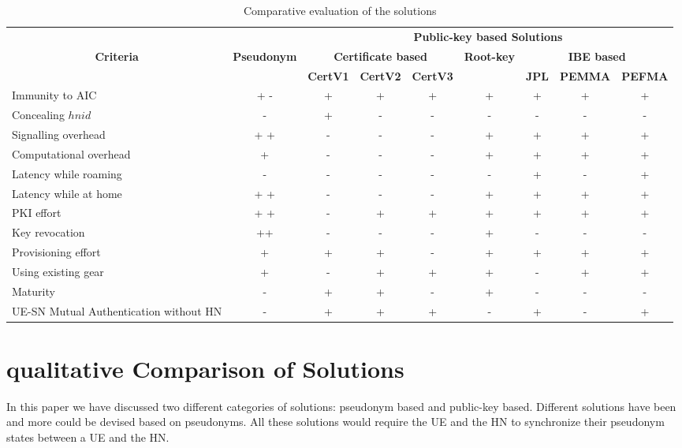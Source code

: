 \documentclass{river-journal}
\begin{document}
\begin{table}
\begin{center}
\caption{Comparative evaluation of the solutions}
\begin{tabular}[t]{|l|c|c|c|c|c|c|c|c|}
\hline
\multicolumn{1}{|c|}{} & \multicolumn{1}{|c|}{} & \multicolumn{7}{|c|}{\textbf{Public-key based Solutions}}\\
\cline{3-9}
\multicolumn{1}{|c|}{\textbf{Criteria}} & \multicolumn{1}{|c|}{\textbf{Pseudonym}} & \multicolumn{3}{|c|}{\textbf{Certificate based}} & \multicolumn{1}{|c|}{\textbf{Root-key}} & \multicolumn{3}{|c|}{\textbf{IBE based}}\\
\cline{3-5} \cline{7-9}
\textbf{} &  & \textbf{CertV1} & \textbf{CertV2} & \textbf{CertV3} & \textbf{} & \textbf{JPL} & \textbf{PEMMA} & \textbf{PEFMA}\\
\hline \hline
Immunity to AIC & + - & + & + & + & + & + & + & + \\ \hline
Concealing $hnid$ & - & + & - & - & - & - & - & - \\ \hline
Signalling overhead & + + & - & - & - & + & + & + & + \\ \hline
Computational overhead & + & - & - & - & + & + & + & + \\ \hline
Latency while roaming & - & - & -  & - & - & + & - & + \\ \hline
Latency while at home & + + & - & -  & - & + & + & + & + \\ \hline
PKI effort & + + &  - & + & + & + & + & + & + \\ \hline
Key revocation & ++ & - & - & - & + & - & - & - \\ \hline
Provisioning effort & + & + & + & - & + & + & + & + \\ \hline
Using existing gear & + & - & + & + & + & - & + & + \\ \hline
Maturity  & - & + & + & - & + & - & - & - \\ \hline
UE-SN Mutual Authentication without HN & - & + & + & + & - & + & - & + \\ \hline
\end{tabular}
\label{table:comparison}
\end{center}
\end{table}



\section{qualitative Comparison of Solutions}
\label{sec:evaluation}
In this paper we have discussed two different categories of solutions: pseudonym based and public-key based. Different solutions \cite{pseudonym_valtteri_philip,pseudonym_ericsson,CCS15,SSR15} have been and more could be devised based on pseudonyms. All these solutions would require the UE and the HN to synchronize their pseudonym states between a UE and the HN.
\end{document}
